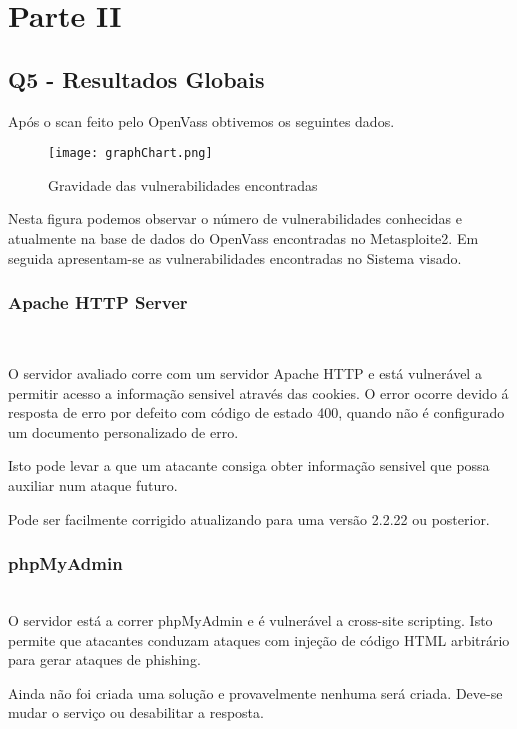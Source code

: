 \section{Parte II}

\subsection{Q5 - Resultados Globais}

Após o scan feito pelo OpenVass obtivemos os seguintes dados.

\begin{figure}[H]

  \centering

  \texttt{[image: graphChart.png]}

  \caption {Gravidade das vulnerabilidades encontradas}

  \label {fig1}

\end{figure}

Nesta figura podemos observar o número de vulnerabilidades conhecidas e atualmente na base de dados do OpenVass encontradas no Metasploite2.
Em seguida apresentam-se as vulnerabilidades encontradas no Sistema visado.

\subsubsection{Apache HTTP Server}
\hfill\\

\par O servidor avaliado corre com um servidor Apache HTTP e está vulnerável a permitir acesso a informação sensivel através das cookies. O error ocorre devido á resposta de erro por defeito com código de estado 400, quando não é configurado um documento personalizado de erro.
\par Isto pode levar a que um atacante consiga obter informação sensivel que possa auxiliar num ataque futuro.
\par Pode ser facilmente corrigido atualizando para uma versão 2.2.22 ou posterior.

\subsubsection{phpMyAdmin}
\hfill\\

O servidor está a correr phpMyAdmin e é vulnerável a cross-site scripting. Isto permite que atacantes conduzam ataques com injeção de código HTML arbitrário para gerar ataques de phishing.
\par Ainda não foi criada uma solução e provavelmente nenhuma será criada. Deve-se mudar o serviço ou desabilitar a resposta.


